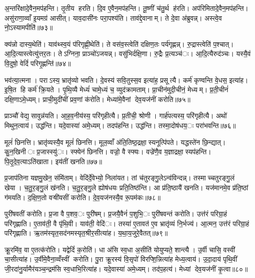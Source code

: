 अ॒न्तरि॑क्षादे॒वैन॒मप॑हन्ति। तृ॒तीय हरति। दि॒व ए॒वैन॒मप॑हन्ति। तू॒ष्णीं च॑तु॒र्थ ह॑रति। अप॑रिमितादे॒वैन॒मप॑हन्ति। असु॑राणा॒व्वाँ इ॒यमग्र॑ आसीत्। याव॒दासी॑नः परा॒पश्य॑ति। ताव॑द्दे॒वानाम्। ते दे॒वा अ॑ब्रुवन्न्। अस्त्वे॒व नो॒ऽस्यामपीति॑॥७३॥

क्य॑न्नो दास्य॒थेति॑। याव॑थ्स्व॒यं प॑रिगृह्णी॒थेति॑। ते वस॑व॒स्त्वेति॑ दक्षिण॒तः पर्य॑गृह्णन्न्। रु॒द्रास्त्वेति॑ प॒श्चात्। आ॒दि॒त्यास्त्वेत्यु॑त्तर॒तः। तेऽग्निना॒ प्राञ्चो॑ऽजयन्न्। वसु॑भिर्दक्षि॒णा। रु॒द्रैः प्र॒त्यञ्च॑ः। आ॒दि॒त्यैरुद॑ञ्चः। यस्यै॒वं वि॒दुषो॒ वेदिं॑ परिगृ॒ह्णन्ति॑॥७४॥

भव॑त्या॒त्मना। पराऽस्य॒ भ्रातृ॑व्यो भवति। दे॒वस्य॑ सवि॒तुस्स॒व इत्या॑ह॒ प्रसूत्यै। कर्म॑ कृण्वन्ति वे॒धस॒ इत्या॑ह। इ॒षि॒त हि कर्म॑ क्रि॒यते। पृ॒थि॒व्यै मेध्यं॑ चामे॒ध्यं च॒ व्युद॑क्रामताम्। प्रा॒चीन॑मुदी॒चीनं॒ मेध्यम्। प्र॒ती॒चीनं॑ दक्षि॒णाऽमे॒ध्यम्। प्राची॒मुदी॑चीं प्रव॒णां क॑रोति। मेध्या॑मे॒वैनां देव॒यज॑नीं करोति॥७५॥

प्राञ्चौ॑ वेद्य॒सावुन्न॑यति। आ॒ह॒व॒नीय॑स्य॒ परि॑गृहीत्यै। प्र॒तीची॒ श्रोणी। गार्ह॑पत्यस्य॒ परि॑गृहीत्यै। अथो॑ मिथुन॒त्वाय॑। उद्ध॑न्ति। यदे॒वास्या॑ अमे॒ध्यम्। तदप॑हन्ति। उद्ध॑न्ति। तस्मा॒दोष॑धय॒ः परा॑भवन्ति॥७६॥

मूलं॑ छिनत्ति। भ्रातृ॑व्यस्यै॒व मूलं॑ छिनत्ति। मूल॒व्वाँ अ॑ति॒तिष्ठ॒द्रक्षा॒स्यनूत्पि॑पते। यद्धस्ते॑न छि॒न्द्यात्। कु॒न॒खिनीः प्र॒जास्स्यु॑ः। स्फ्येन॑ छिनत्ति। वज्रो॒ वै स्फ्यः। वज्रे॑णै॒व य॒ज्ञाद्रक्षा॒स्यप॑हन्ति। पि॒तृ॒दे॒व॒त्याऽति॑खाता। इय॑तीं खनति॥७७॥

प्र॒जाप॑तिना यज्ञमु॒खेन॒ संमि॑ताम्। वेदि॑र्दे॒वेभ्यो॒ निला॑यत। तां च॑तुरङ्गु॒लेऽन्व॑विन्दन्न्। तस्माच्चतुरङ्गु॒लं खेया। च॒तु॒र॒ङ्गु॒लं ख॑नति। च॒तु॒र॒ङ्गु॒ले ह्योष॑धयः प्रति॒तिष्ठ॑न्ति। आ प्र॑ति॒ष्ठायै॑ खनति। यज॑मानमे॒व प्र॑ति॒ष्ठां ग॑मयति। द॒क्षि॒ण॒तो वऱ्षी॑यसीं करोति। दे॒व॒यज॑नस्यै॒व रू॒पम॑कः॥७८॥

पुरी॑षवतीं करोति। प्र॒जा वै प॒शव॒ः पुरी॑षम्। प्र॒जयै॒वैनं॑ प॒शुभि॒ः पुरी॑षवन्तं करोति। उत्त॑रं परिग्रा॒हं परि॑गृह्णाति। ए॒ताव॑ती॒ वै पृ॑थि॒वी। याव॑ती॒ वेदि॑ः। तस्या॑ ए॒तावत॑ ए॒व भ्रातृ॑व्यं नि॒र्भज्य॑। आ॒त्मन॒ उत्त॑रं परिग्रा॒हं परि॑गृह्णाति। ऋ॒तम॑स्यृत॒सद॑नमस्यृत॒श्रीर॒सीत्या॑ह। य॒था॒य॒जुरे॒वैतत्॥७९॥

क्रू॒रमि॑व॒ वा ए॒तत्क॑रोति। यद्वेदिं॑ क॒रोति॑। धा अ॑सि स्व॒धा अ॒सीति॑ योयुप्यते॒ शान्त्यै। उ॒र्वी चासि॒ वस्वी॑ चा॒सीत्या॑ह। उ॒र्वीमे॒वैना॒व्वँस्वीं करोति। पु॒रा क्रू॒रस्य॑ वि॒सृपो॑ विरप्शि॒न्नित्या॑ह मेध्य॒त्वाय॑। उ॒दा॒दाय॑ पृथि॒वीं जी॒रदा॑नु॒र्यामैर॑यञ्च॒न्द्रम॑सि स्व॒धाभि॒रित्या॑ह। यदे॒वास्या॑ अमे॒ध्यम्। तद॑प॒हत्य॑। मेध्यां देव॒यज॑नीं कृ॒त्वा॥८०॥

